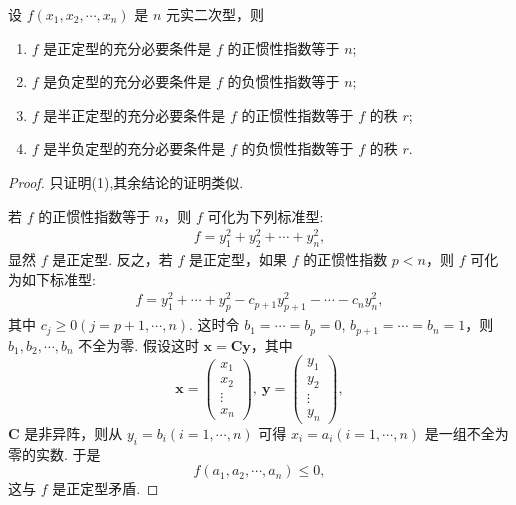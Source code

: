\documentclass[../../main.tex]{subfiles}
\begin{document}
\begin{theorem}\label{theorem:正定型的充要条件}
设 $f(x_1,x_2,\cdots,x_n)$ 是 $n$ 元实二次型，则 
\begin{enumerate}[(1)]
\item $f$ 是正定型的充分必要条件是 $f$ 的正惯性指数等于 $n$;

\item $f$ 是负定型的充分必要条件是 $f$ 的负惯性指数等于 $n$; 

\item $f$ 是半正定型的充分必要条件是 $f$ 的正惯性指数等于 $f$ 的秩 $r$; 

\item $f$ 是半负定型的充分必要条件是 $f$ 的负惯性指数等于 $f$ 的秩 $r$.
\end{enumerate}
\end{theorem}
\begin{proof}
只证明(1),其余结论的证明类似. 

若 $f$ 的正惯性指数等于 $n$，则 $f$ 可化为下列标准型:
\begin{align*}
f = y_1^2 + y_2^2 + \cdots + y_n^2,
\end{align*}
显然 $f$ 是正定型. 反之，若 $f$ 是正定型，如果 $f$ 的正惯性指数 $p < n$，则 $f$ 可化为如下标准型:
\begin{align}
f = y_1^2 + \cdots + y_p^2 - c_{p + 1}y_{p + 1}^2 - \cdots - c_ny_n^2,\label{eq:8.4.1}
\end{align}
其中 $c_j\geqslant  0 (j = p + 1,\cdots,n)$. 这时令 $b_1 = \cdots = b_p = 0$, $b_{p + 1} = \cdots = b_n = 1$，则 $b_1,b_2,\cdots,b_n$ 不全为零. 假设这时 $\boldsymbol{x}=\boldsymbol{C}\boldsymbol{y}$，其中
\[
\boldsymbol{x}=\begin{pmatrix}
x_1\\
x_2\\
\vdots\\
x_n
\end{pmatrix},\ \boldsymbol{y}=\begin{pmatrix}
y_1\\
y_2\\
\vdots\\
y_n
\end{pmatrix},
\]
$\boldsymbol{C}$ 是非异阵，则从 $y_i = b_i (i = 1,\cdots,n)$ 可得 $x_i = a_i (i = 1,\cdots,n)$ 是一组不全为零的实数. 于是
\[
f(a_1,a_2,\cdots,a_n)\leqslant  0,
\]
这与 $f$ 是正定型矛盾. 

\end{proof}
\end{document}

